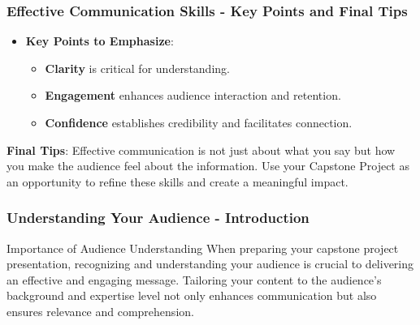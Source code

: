 \documentclass{beamer}
\begin{document}
\begin{frame}[fragile]
    \frametitle{Effective Communication Skills - Key Points and Final Tips}
    \begin{itemize}
        \item \textbf{Key Points to Emphasize}:
        \begin{itemize}
            \item \textbf{Clarity} is critical for understanding.
            \item \textbf{Engagement} enhances audience interaction and retention.
            \item \textbf{Confidence} establishes credibility and facilitates connection.
        \end{itemize}
    \end{itemize}

    \textbf{Final Tips}: Effective communication is not just about what you say but how you make the audience feel about the information. Use your Capstone Project as an opportunity to refine these skills and create a meaningful impact.
\end{frame}

\begin{frame}[fragile]
    \frametitle{Understanding Your Audience - Introduction}
    \begin{block}{Importance of Audience Understanding}
        When preparing your capstone project presentation, recognizing and understanding your audience is crucial to delivering an effective and engaging message. Tailoring your content to the audience’s background and expertise level not only enhances communication but also ensures relevance and comprehension.
    \end{block}
\end{frame}
\end{document}
